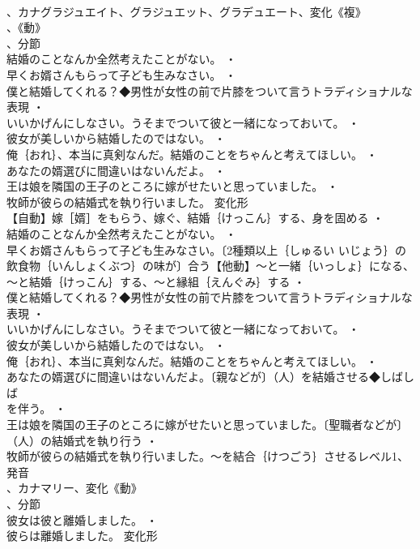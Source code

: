 \documentclass[8pt]{extreport}
\begin{document}
\begin{CJK}{UTF8}{min}
\\	、カナグラジュエイト、グラジュエット、グラデュエート、変化《複》
\\	、《動》
\\	、分節
\\	結婚のことなんか全然考えたことがない。 ・
\\	早くお婿さんもらって子ども生みなさい。 ・
\\	僕と結婚してくれる？◆男性が女性の前で片膝をついて言うトラディショナルな表現 ・
\\	いいかげんにしなさい。うそまでついて彼と一緒になっておいて。 ・
\\	彼女が美しいから結婚したのではない。 ・
\\	俺｛おれ｝、本当に真剣なんだ。結婚のことをちゃんと考えてほしい。 ・
\\	あなたの婿選びに間違いはないんだよ。 ・
\\	王は娘を隣国の王子のところに嫁がせたいと思っていました。 ・
\\	牧師が彼らの結婚式を執り行いました。	変化形 
\\	【自動】嫁［婿］をもらう、嫁ぐ、結婚｛けっこん｝する、身を固める ・
\\	結婚のことなんか全然考えたことがない。 ・
\\	早くお婿さんもらって子ども生みなさい。〔2種類以上｛しゅるい いじょう｝の飲食物｛いんしょくぶつ｝の味が〕合う【他動】～と一緒｛いっしょ｝になる、～と結婚｛けっこん｝する、～と縁組｛えんぐみ｝する ・
\\	僕と結婚してくれる？◆男性が女性の前で片膝をついて言うトラディショナルな表現 ・
\\	いいかげんにしなさい。うそまでついて彼と一緒になっておいて。 ・
\\	彼女が美しいから結婚したのではない。 ・
\\	俺｛おれ｝、本当に真剣なんだ。結婚のことをちゃんと考えてほしい。 ・
\\	あなたの婿選びに間違いはないんだよ。〔親などが〕（人）を結婚させる◆しばしば
\\	を伴う。 ・
\\	王は娘を隣国の王子のところに嫁がせたいと思っていました。〔聖職者などが〕（人）の結婚式を執り行う ・
\\	牧師が彼らの結婚式を執り行いました。～を結合｛けつごう｝させるレベル1、発音
\\	、カナマリー、変化《動》
\\	、分節
\\	彼女は彼と離婚しました。 ・
\\	彼らは離婚しました。	変化形 

\end{CJK}
\end{document}
